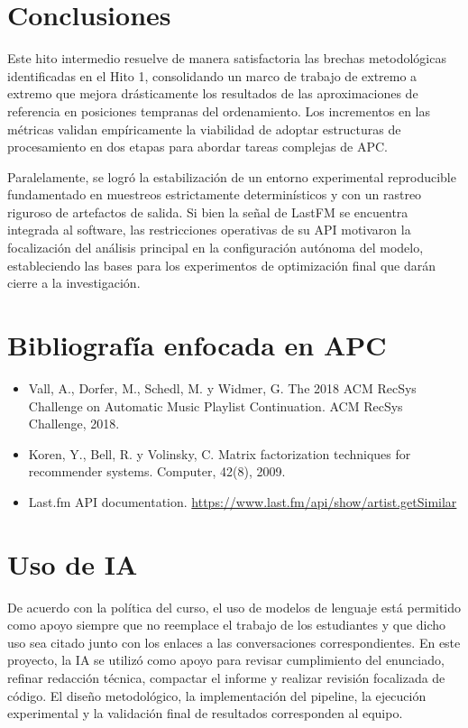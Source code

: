 \documentclass[10pt,letterpaper]{article}
\begin{document}
\section{Conclusiones}

Este hito intermedio resuelve de manera satisfactoria las brechas metodológicas identificadas en el Hito 1, consolidando un marco de trabajo de extremo a extremo que mejora drásticamente los resultados de las aproximaciones de referencia en posiciones tempranas del ordenamiento. Los incrementos en las métricas validan empíricamente la viabilidad de adoptar estructuras de procesamiento en dos etapas para abordar tareas complejas de APC.

Paralelamente, se logró la estabilización de un entorno experimental reproducible fundamentado en muestreos estrictamente determinísticos y con un rastreo riguroso de artefactos de salida. Si bien la señal de LastFM se encuentra integrada al software, las restricciones operativas de su API motivaron la focalización del análisis principal en la configuración autónoma del modelo, estableciendo las bases para los experimentos de optimización final que darán cierre a la investigación.

\section{Bibliografía enfocada en APC}

\begingroup
\footnotesize
\begin{itemize}
    \item Vall, A., Dorfer, M., Schedl, M. y Widmer, G. The 2018 ACM RecSys Challenge on Automatic Music Playlist Continuation. ACM RecSys Challenge, 2018.
    \item Koren, Y., Bell, R. y Volinsky, C. Matrix factorization techniques for recommender systems. Computer, 42(8), 2009.
    \item Last.fm API documentation. \url{https://www.last.fm/api/show/artist.getSimilar}
\end{itemize}
\endgroup

\section{Uso de IA}

De acuerdo con la política del curso, el uso de modelos de lenguaje está permitido como apoyo siempre que no reemplace el trabajo de los estudiantes y que dicho uso sea citado junto con los enlaces a las conversaciones correspondientes. En este proyecto, la IA se utilizó como apoyo para revisar cumplimiento del enunciado, refinar redacción técnica, compactar el informe y realizar revisión focalizada de código. El diseño metodológico, la implementación del pipeline, la ejecución experimental y la validación final de resultados corresponden al equipo.
\end{document}
